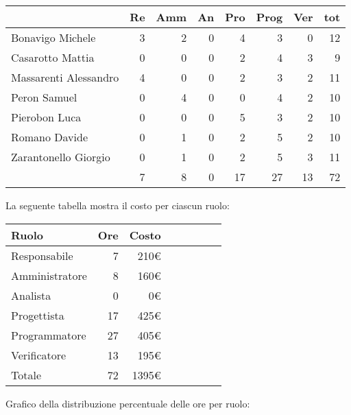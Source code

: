 \begin{table}[ht]
    \begin{tabularx}{\linewidth}{X|rrrrrrr}
    \rowcolor{gray!30}& Re & Amm & An & Pro & Prog & Ver & tot \\
    \hline
    Bonavigo Michele                        & 3 & 2 & 0 & 4 & 3 & 0 & 12 \\
    \rowcolor{gray!10}Casarotto Mattia      & 0 & 0 & 0 & 2 & 4 & 3 & 9 \\
    Massarenti Alessandro                   & 4 & 0 & 0 & 2 & 3 & 2 & 11 \\
    \rowcolor{gray!10}Peron Samuel          & 0 & 4 & 0 & 0 & 4 & 2 & 10 \\
    Pierobon Luca                           & 0 & 0 & 0 & 5 & 3 & 2 & 10 \\
    \rowcolor{gray!10}Romano Davide         & 0 & 1 & 0 & 2 & 5 & 2 & 10 \\
    Zarantonello Giorgio                    & 0 & 1 & 0 & 2 & 5 & 3 & 11 \\
    \hline                                  & 7 & 8 & 0 & 17 & 27 & 13 & 72 \\ 
    \end{tabularx}
\end{table}

La seguente tabella mostra il costo per ciascun ruolo:
\begin{table}[ht]
    \begin{tabularx}{\linewidth}{X|rrrrrrr}
    \rowcolor{gray!30}Ruolo & Ore & Costo \\
    \hline
    Responsabile                            & 7  & 210€ \\
    \rowcolor{gray!10}Amministratore        & 8  & 160€ \\
    Analista                                & 0  & 0€ \\
    \rowcolor{gray!10}Progettista           & 17  & 425€ \\
    Programmatore                           & 27  & 405€ \\
    \rowcolor{gray!10}Verificatore          & 13  & 195€ \\
    \hline Totale                           & 72  & 1395€ \\ 
    \end{tabularx}
\end{table}

Grafico della distribuzione percentuale delle ore per ruolo:
\begin{center}
\end{center}


